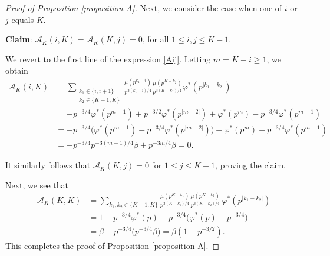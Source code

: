\documentclass[10pt,a4paper]{amsart}
\newcommand{\A}{\mathcal{A}}
\newcommand{\U}{\mathcal{U}}
\newcommand{\bt}{\beta}
\begin{document}
\begin{proof}[Proof of Proposition \ref{proposition A}]
\medskip

Next, we consider the case when one of $i$ or $j$ equals $K$. 

\textbf{Claim}: $\A_K(i,K) = \A_K(K, j) = 0$, for all $1 \leq i, j \leq K-1$. 

We revert to the first line of the expression \eqref{Aij}. Letting $m = K-i \geq 1$, we obtain
\begin{equation*}
\begin{split}
\A_K(i, K) 
&= \sum\limits_{\substack{k_1 \in \{i, i+1\}\\ k_2 \in \{K-1, K\}}} \frac{\mu(p^{k_1 - i})}{p^{3(k_1 - i)/4}} \frac{\mu(p^{K-k_2})}{p^{3(K-k_2)/4}} \varphi^*(p^{|k_1 - k_2|})\\
&= - p^{-3/4} \varphi^*(p^{m-1})  + p^{-3/2} \varphi^*(p^{|m-2|}) + \varphi^*(p^m)  - p^{-3/4} \varphi^*(p^{m-1}) \\
&= -p^{-3/4} \big( \varphi^*(p^{m-1}) - p^{-3/4} \varphi^*(p^{|m-2|})  \bigr) + \varphi^*(p^m)  - p^{-3/4} \varphi^*(p^{m-1})\\
&= -p^{-3/4} p^{-3(m-1)/4} \bt  +  p^{-3m/4} \bt
= 0.
\end{split}
\end{equation*}

It similarly follows that $\A_K(K, j) = 0$ for $1 \leq j \leq K-1$, proving the claim. 

Next, we see that
%
\begin{equation*}
\begin{split}
\A_K(K, K) 
&= \sum\limits_{k_1, k_2 \in \{K-1, K\}} \frac{ \mu(p^{K-k_1})}{p^{3(K-k_1)/4}} \frac{\mu(p^{K-k_2})}{p^{3(K-k_2)/4}} \,\varphi^*(p^{|k_1 - k_2|}) \\
&= 1 - p^{-3/4} \varphi^*(p) -p^{-3/4} \bigl( \varphi^*(p) - p^{-3/4}  \bigr)\\
&= \bt - p^{-3/4} \bigl( p^{-3/4} \bt \bigr) 
= \bt(1 - p^{-3/2}).
\end{split}
\end{equation*}
%
This completes the proof of Proposition \ref{proposition A}. 
\end{proof}
\end{document}
